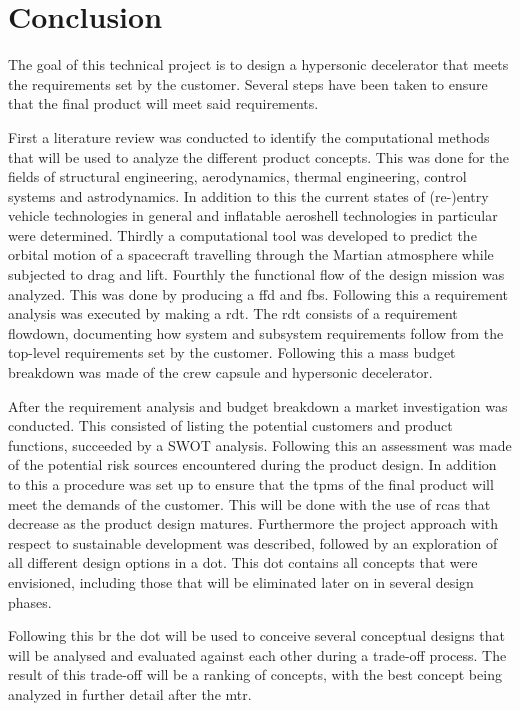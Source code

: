 \section{Conclusion}\label{cha:conclusion}
The goal of this technical project is to design a hypersonic decelerator that meets the requirements set by the customer. Several steps have been taken to ensure that the final product will meet said requirements.

First a literature review was conducted to identify the computational methods that will be used to analyze the different product concepts. This was done for the fields of structural engineering, aerodynamics, thermal engineering, control systems and astrodynamics. In addition to this the current states of (re-)entry vehicle technologies in general and inflatable aeroshell technologies in particular were determined. Thirdly a computational tool was developed to predict the orbital motion of a spacecraft travelling through the Martian atmosphere while subjected to drag and lift.
 Fourthly the functional flow of the design mission was analyzed. This was done by producing a \acrlong{ffd} and \acrlong{fbs}. Following this a requirement analysis was executed by making a \acrlong{rdt}. The \gls{rdt} consists of a requirement flowdown, documenting how system and subsystem requirements follow from the top-level requirements set by the customer.  Following this a mass budget breakdown was made of the crew capsule and hypersonic decelerator.

After the requirement analysis and budget breakdown a market investigation was conducted. This consisted of listing the potential customers and product functions, succeeded by a SWOT analysis. Following this an assessment was made of the potential risk sources encountered during the product design. In addition to this a procedure was set up to ensure that the \acrlong{tpm}s of the final product will meet the demands of the customer. This will be done with the use of \acrlong{rca}s that decrease as the product design matures. Furthermore the project approach with respect to sustainable development was described, followed by an exploration of all different design options in a \acrfull{dot}. This \gls{dot} contains all concepts that were envisioned, including those that will be eliminated later on in several design phases.

Following this \acrfull{br} the \gls{dot} will be used to conceive several conceptual designs that will be analysed and evaluated against each other during a trade-off process. The result of this trade-off will be a ranking of concepts, with the best concept being analyzed in further detail after the \acrfull{mtr}.